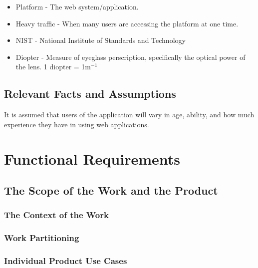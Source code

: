 \documentclass[12pt, titlepage]{article}
\begin{document}
\begin{itemize}
    \item Platform - The web system/application.
    \item Heavy traffic - When many users are accessing the platform at one time.
    \item NIST - National Institute of Standards and Technology
    \item Diopter - Measure of eyeglass perscription, specifically the optical power of the lens. 1 diopter = 1m$^{-1}$
\end{itemize}

\subsection{Relevant Facts and Assumptions}

It is assumed that users of the application will vary in age, ability, and how much experience they have in using web applications. 

\section{Functional Requirements}

\subsection{The Scope of the Work and the Product}

\subsubsection{The Context of the Work}

\subsubsection{Work Partitioning}

\subsubsection{Individual Product Use Cases}
\end{document}
